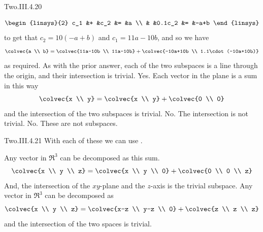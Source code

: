 \begin{ans}{Two.III.4.20}
\begin{exparts}
\begin{equation*}
             \begin{linsys}{2}
               c_1  &+  &c_2    &=  &a  \\
                    &   &0.1c_2 &=  &-a+b
             \end{linsys}
           \end{equation*}
           to get that $c_2=10(-a+b)$ and $c_1=11a-10b$, and so we have
           \begin{equation*}
             \colvec{a \\ b}=\colvec{11a-10b \\ 11a-10b}
                             +\colvec{-10a+10b \\ 1.1\cdot(-10a+10b)}
           \end{equation*}
           as required.
           As with the prior answer, each of the two subspaces is a line
           through the origin, and their intersection is trivial.
         \partsitem Yes.
           Each vector in the plane is a sum in this way
           \begin{equation*}
             \colvec{x \\ y}=\colvec{x \\ y}+\colvec{0 \\ 0}
           \end{equation*}
           and the intersection of the two subspaces is trivial.
         \partsitem No.
           The intersection is not trivial.
         \partsitem No.
           These are not subspaces.
      \end{exparts}
    
\end{ans}
\begin{ans}{Two.III.4.21}
      With each of these we can use .
      \begin{exparts}
        \partsitem Any vector in \( \Re^3 \) can be decomposed as this sum.
          \begin{equation*}
            \colvec{x \\ y \\ z}
            =\colvec{x \\ y \\ 0}
            +\colvec{0 \\ 0 \\ z}
          \end{equation*}
          And, the intersection of the $xy$-plane and the $z$-axis is the
          trivial subspace.
        \partsitem Any vector in \( \Re^3 \) can be decomposed as
          \begin{equation*}
            \colvec{x \\ y \\ z}
            =\colvec{x-z \\ y-z \\ 0}
            +\colvec{z \\ z \\ z}
          \end{equation*}
          and the intersection of the two spaces is trivial.
      \end{exparts}
    
\end{ans}
